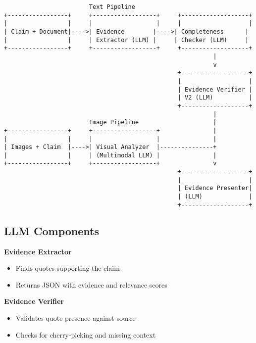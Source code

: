 \documentclass[11pt]{article}
\begin{document}
\newpage
\begin{verbatim}
                        Text Pipeline
+-----------------+     +------------------+     +-------------------+
|                 |     |                  |     |                   |
| Claim + Document|---->| Evidence        |---->| Completeness      |
|                 |     | Extractor (LLM) |     | Checker (LLM)     |
+-----------------+     +------------------+     +-------------------+
                                                           |
                                                           v
                                                 +-------------------+
                                                 |                   |
                                                 | Evidence Verifier |
                                                 | V2 (LLM)          |
                                                 +-------------------+
                                                           |
                        Image Pipeline                     |
+-----------------+     +------------------+               |
|                 |     |                  |               |
| Images + Claim  |---->| Visual Analyzer  |---------------+
|                 |     | (Multimodal LLM) |               |
+-----------------+     +------------------+               v
                                                 +-------------------+
                                                 |                   |
                                                 | Evidence Presenter|
                                                 | (LLM)             |
                                                 +-------------------+
\end{verbatim}

\subsection{LLM Components}

\textbf{Evidence Extractor}
\begin{itemize}
\item Finds quotes supporting the claim
\item Returns JSON with evidence and relevance scores
\end{itemize}

\textbf{Evidence Verifier}
\begin{itemize}
\item Validates quote presence against source
\item Checks for cherry-picking and missing context
\end{itemize}
\end{document}
